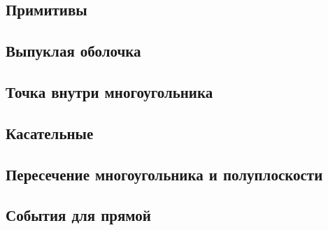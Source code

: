 \subsection{Примитивы}

\subsection{Выпуклая оболочка}

\subsection{Точка внутри многоугольника}

\subsection{Касательные}

\subsection{Пересечение многоугольника и полуплоскости}

\subsection{События для прямой}

